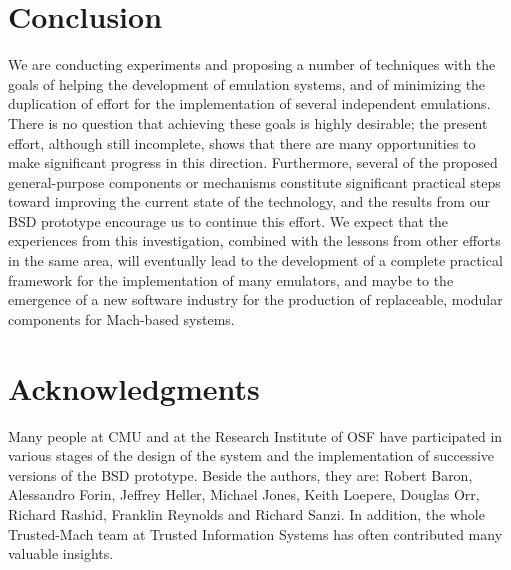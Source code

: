 \section{Conclusion}

We are conducting experiments and proposing a number of techniques
with the goals of helping the development of emulation systems, and of
minimizing the duplication of effort for the implementation of several
independent emulations.  There is no question that achieving these
goals is highly desirable; the present effort, although still
incomplete, shows that there are many opportunities to make
significant progress in this direction.  Furthermore, several of the
proposed general-purpose components or mechanisms constitute
significant practical steps toward improving the current state of the
technology, and the results from our BSD prototype encourage us to
continue this effort.  We expect that the experiences from this
investigation, combined with the lessons from other efforts in the
same area, will eventually lead to the development of a complete
practical framework for the implementation of many emulators, and
maybe to the emergence of a new software industry for the production
of replaceable, modular components for Mach-based systems.



\section*{Acknowledgments}

Many people at CMU and at the Research Institute of OSF have
participated in various stages of the design of the system and the
implementation of successive versions of the BSD prototype. Beside the
authors, they are: Robert Baron, Alessandro Forin, Jeffrey Heller,
Michael Jones, Keith Loepere, Douglas Orr, Richard Rashid, Franklin
Reynolds and Richard Sanzi. In addition, the whole Trusted-Mach team
at Trusted Information Systems has often contributed many valuable
insights.


